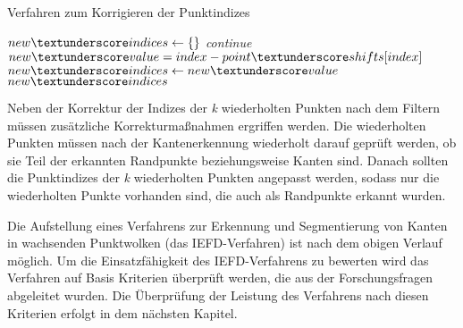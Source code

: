 \begin{algorithm}[h]
	\caption{Verfahren zum Korrigieren der Punktindizes}
	\label{alg: correct_points}
	\begin{algorithmic}[1]
		\State $new\textunderscore indices \gets \{\}$
		\State \textit{continue}
		\EndIf
		\State $new\textunderscore value = index - point\textunderscore shifts[index]$
		\State $new\textunderscore indices \gets new\textunderscore value$
		\EndFor
		\Return $new\textunderscore indices$
		\EndFunction
	\end{algorithmic}
\end{algorithm}

Neben der Korrektur der Indizes der \textit{k} wiederholten Punkten nach dem Filtern müssen zusätzliche Korrekturmaßnahmen ergriffen werden. Die wiederholten Punkten müssen nach der Kantenerkennung wiederholt darauf geprüft werden, ob sie Teil der erkannten Randpunkte beziehungsweise Kanten sind. Danach sollten die Punktindizes der \textit{k} wiederholten Punkten angepasst werden, sodass nur die wiederholten Punkte vorhanden sind, die auch als Randpunkte erkannt wurden. 

Die Aufstellung eines Verfahrens zur Erkennung und Segmentierung von Kanten in wachsenden Punktwolken (das IEFD-Verfahren) ist nach dem obigen Verlauf möglich. Um die Einsatzfähigkeit des IEFD-Verfahrens zu bewerten wird das Verfahren auf Basis Kriterien überprüft werden, die aus der Forschungsfragen abgeleitet wurden. Die Überprüfung der Leistung des Verfahrens nach diesen Kriterien erfolgt in dem nächsten Kapitel.
